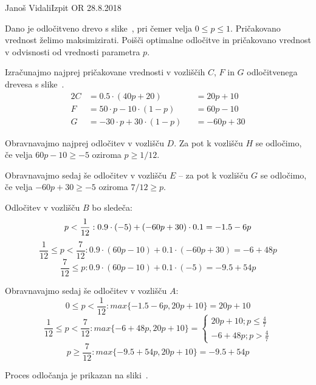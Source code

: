 \begin{naloga}{Janoš Vidali}{Izpit OR 28.8.2018}
\begin{vprasanje}
Dano je odločitveno drevo s slike~\fig,
pri čemer velja $0 \le p \le 1$.
Pričakovano vred\-nost želimo maksimizirati.
Poišči optimalne odločitve in pričakovano vrednost
v odvisnosti od vrednosti parametra $p$.

\begin{slika}
\pgfslika
{}
\end{slika}
\end{vprasanje}

\begin{odgovor}
Izračunajmo najprej pričakovane vrednosti v vozliščih $C$, $F$ in $G$
odločitvenega drevesa s slike~\fig.
\begin{alignat*}{2}
C &= 0.5 \cdot (40 p + 20) &&= 20p + 10 \\
F &= 50 \cdot p - 10 \cdot (1-p) &&= 60 p - 10 \\
G &= - 30 \cdot p + 30 \cdot (1-p) &&=  -60p + 30
\end{alignat*}

Obravnavajmo najprej odločitev v vozlišču $D$.
Za pot k vozlišču $H$ se odločimo,
če velja $60p - 10 \ge -5$ oziroma $p \ge 1/12$.

Obravnavajmo sedaj še odločitev v vozlišču $E$
-- za pot k vozlišču $G$ se odločimo, če velja $-60p + 30 \ge -5$ oziroma $7/12 \ge p$.

Odločitev v vozlišču $B$ bo sledeča:
$$p < {1 \over 12}:  0.9 \cdot (-5) + (-60p + 30) \cdot 0.1 = -1.5 - 6p$$
$$\frac{1}{12} \leq p < \frac{7}{12} : 0.9 \cdot (60p - 10) + 0.1 \cdot (-60p + 30) = -6 + 48p$$
$$\frac{7}{12} \leq p : 0.9 \cdot (60p - 10) + 0.1 \cdot (-5) = - 9.5 + 54 p$$

Obravnavajmo sedaj še odločitev v vozlišču $A$:
$$0 \leq p < \frac{1}{12} : max \{ -1.5 - 6p, 20p + 10 \} = 20p + 10$$
$$\frac{1}{12} \leq p < \frac{7}{12} : max \{ -6 + 48p, 20p + 10 \} = 
\begin{cases}
20p + 10;  p \leq \frac{4}{7} \\
-6 + 48p;  p >\frac{4}{7}
\end{cases}
$$
$$p \ge \frac{7}{12} : max \{ - 9.5 + 54p, 20p + 10 \} = -9.5 +54p $$

Proces odločanja je prikazan na sliki~.

\begin{slika}
\end{slika}


\end{odgovor}
\end{naloga}
